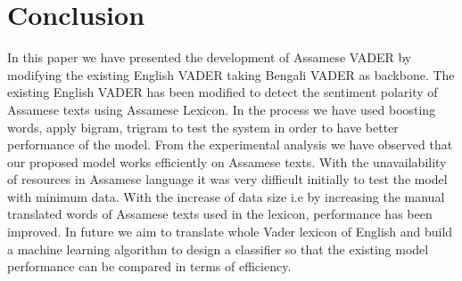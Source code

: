 \documentclass[conference]{IEEEtran}
\begin{document}
\section{Conclusion}
In this paper we have presented the development of Assamese VADER by modifying the existing English VADER taking Bengali VADER as backbone. The existing English VADER has been modified to detect the sentiment polarity of Assamese texts using Assamese Lexicon. In the process we have used boosting words, apply bigram, trigram to test the system in order to have better performance of the model. From the experimental analysis we have observed that our proposed model works efficiently on Assamese texts. With the unavailability of resources in Assamese language it was very difficult initially to test the model with minimum data. With the increase of data size i.e by increasing the manual translated words of Assamese texts used in the lexicon, performance has been improved. In future we aim to translate whole Vader lexicon of English and build a machine learning algorithm to design a classifier so that the existing model performance can be compared in terms of efficiency.
\end{document}

